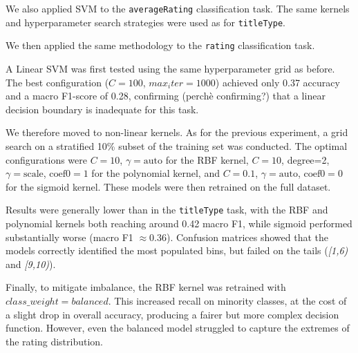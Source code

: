 

We also applied SVM to the \texttt{averageRating} classification task.
The same kernels and hyperparameter search strategies were used as for \texttt{titleType}.

We then applied the same methodology to the \texttt{rating} classification task.

A Linear SVM was first tested using the same hyperparameter grid as before.
The best configuration ($C=100$, $max_iter=1000$) achieved only 0.37 accuracy 
and a macro F1-score of 0.28, confirming (perchè confirming?) that a linear decision 
boundary is inadequate for this task.

We therefore moved to non-linear kernels.
As for the previous experiment, a grid search on a stratified 10\% subset of 
the training set was conducted. The optimal configurations were $C=10$, $\gamma=\text{auto}$ 
for the RBF kernel, $C=10$, degree=2, $\gamma=\text{scale}$, $\text{coef0}=1$ for the polynomial 
kernel, and $C=0.1$, $\gamma=\text{auto}$, $\text{coef0}=0$ for the sigmoid kernel.
These models were then retrained on the full dataset.

Results were generally lower than in the \texttt{titleType} task, with the RBF and polynomial 
kernels both reaching around 0.42 macro F1, while sigmoid performed substantially worse (macro F1 $\approx 0.36$).
Confusion matrices showed that the models correctly identified the most populated bins, but failed on the tails 
(\textit{[1,6)} and \textit{[9,10)}).

Finally, to mitigate imbalance, the RBF kernel was retrained with \texttt{$class\_weight=balanced$}.
This increased recall on minority classes, at the cost of a slight drop in overall accuracy, 
producing a fairer but more complex decision function.
However, even the balanced model struggled to capture the extremes of the rating distribution.

